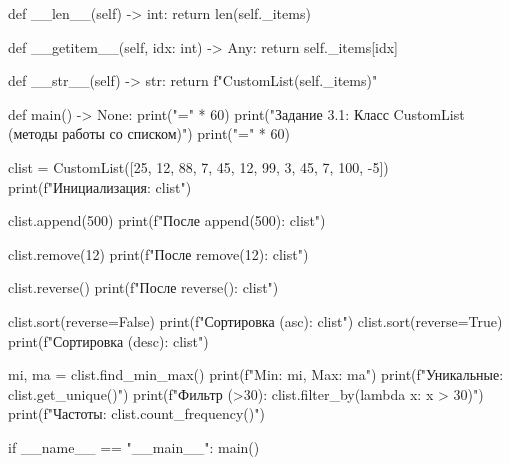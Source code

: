 \documentclass[14pt,a4paper]{extarticle}
\begin{document}
\begin{CodeListing}
    def __len__(self) -> int:
        return len(self._items)

    def __getitem__(self, idx: int) -> Any:
        return self._items[idx]

    def __str__(self) -> str:
        return f"CustomList({self._items})"


def main() -> None:
    print("=" * 60)
    print("Задание 3.1: Класс CustomList (методы работы со списком)")
    print("=" * 60)

    clist = CustomList([25, 12, 88, 7, 45, 12, 99, 3, 45, 7, 100, -5])
    print(f"Инициализация: {clist}")

    clist.append(500)
    print(f"После append(500): {clist}")

    clist.remove(12)
    print(f"После remove(12):  {clist}")

    clist.reverse()
    print(f"После reverse():   {clist}")

    clist.sort(reverse=False)
    print(f"Сортировка (asc):  {clist}")
    clist.sort(reverse=True)
    print(f"Сортировка (desc): {clist}")

    mi, ma = clist.find_min_max()
    print(f"Min: {mi}, Max: {ma}")
    print(f"Уникальные: {clist.get_unique()}")
    print(f"Фильтр (>30): {clist.filter_by(lambda x: x > 30)}")
    print(f"Частоты: {clist.count_frequency()}")


if __name__ == "__main__":
    main()
\end{CodeListing}
\end{document}
